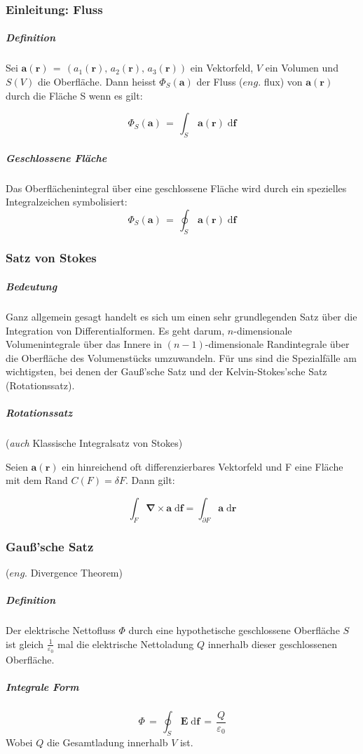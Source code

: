 \documentclass[titlepage,11pt,a4paper,ngerman]{report}
\renewcommand{\vec}[1]{\bm{#1}}
\renewcommand{\epsilon}{\varepsilon}
\newcommand{\vabla}{\vec{\nabla}}
\renewcommand{\paragraph}[1]{\subsubsection{#1}}
\begin{document}
\paragraph{Einleitung: Fluss}
\subparagraph{Definition}
Sei $\vec{a}(\vec{r})\,=\,(a_1(\vec{r}),\,a_2(\vec{r}),\, a_3(\vec{r}))$ ein Vektorfeld, $V$ ein Volumen und $S(V)$ die Oberfläche. Dann heisst $\Phi_S(\vec{a})$ der Fluss ($eng.$ flux) von $\vec{a}(\vec{r})$ durch die Fläche S wenn es gilt:

\[\Phi_S(\vec{a})\,=\,\int_{S}\,\vec{a}(\vec{r})\;\mathrm{d}\vec{f}\]

\subparagraph{Geschlossene Fläche} Das Oberflächenintegral über eine geschlossene Fläche wird durch ein spezielles Integralzeichen symbolisiert:
\[\Phi_S(\vec{a})\,=\,\oint_S\,\vec{a}(\vec{r})\;\mathrm{d}\vec{f}\]

\paragraph{Satz von Stokes}
\subparagraph{Bedeutung}
Ganz allgemein gesagt handelt es sich um einen sehr grundlegenden Satz über die Integration von Differentialformen. Es geht darum, $n$-dimensionale Volumenintegrale über das Innere in $(n-1)$-dimensionale Randintegrale über die Oberfläche des Volumenstücks umzuwandeln. Für uns sind die Spezialfälle am wichtigsten, bei denen der Gauß'sche Satz und der Kelvin-Stokes'sche Satz (Rotationssatz).

\subparagraph{Rotationssatz} (\textit{auch} Klassische Integralsatz von Stokes) \hfill \break

Seien $\vec{a}(\vec{r})$ ein hinreichend oft differenzierbares Vektorfeld und F eine Fläche mit dem Rand $C(F) = \delta F$. Dann gilt:

$$\int_{F} \vabla \times \vec{a}\; \mathrm{d}\vec{f} = \int_{\partial F}\vec{a}\; \mathrm{d}\vec{r}$$

\paragraph{Gauß'sche Satz}
($eng.$ Divergence Theorem)

\subparagraph{Definition} Der elektrische Nettofluss $\Phi$ durch eine hypothetische geschlossene Oberfläche $S$ ist gleich $\frac{1}{\epsilon_0}$ mal die elektrische Nettoladung $Q$ innerhalb dieser geschlossenen Oberfläche.

\subparagraph{Integrale Form}
\[\Phi\,=\,\oint_S\, \vec{E}\; \mathrm{d}\vec{f}\,=\,\frac{Q}{\epsilon_0}\]
Wobei $Q$ die Gesamtladung innerhalb $V$ ist.
\end{document}
